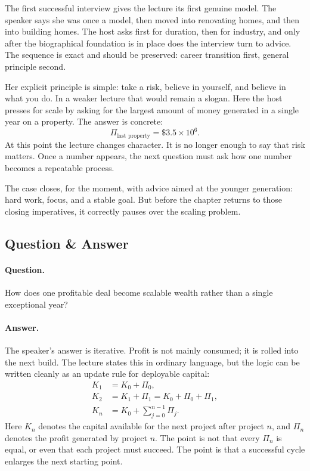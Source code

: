 The first successful interview gives the lecture its first genuine model. The speaker says she was once a model, then moved into renovating homes, and then into building homes. The host asks first for duration, then for industry, and only after the biographical foundation is in place does the interview turn to advice. The sequence is exact and should be preserved: career transition first, general principle second.

Her explicit principle is simple: take a risk, believe in yourself, and believe in what you do. In a weaker lecture that would remain a slogan. Here the host presses for scale by asking for the largest amount of money generated in a single year on a property. The answer is concrete:
\begin{equation}
\Pi_{\text{last property}} = \$3.5\times 10^6.
\end{equation}
At this point the lecture changes character. It is no longer enough to say that risk matters. Once a number appears, the next question must ask how one number becomes a repeatable process.

The case closes, for the moment, with advice aimed at the younger generation: hard work, focus, and a stable goal. But before the chapter returns to those closing imperatives, it correctly pauses over the scaling problem.

\subsection{Question \& Answer}

\paragraph{Question.} How does one profitable deal become scalable wealth rather than a single exceptional year?

\paragraph{Answer.} The speaker's answer is iterative. Profit is not mainly consumed; it is rolled into the next build. The lecture states this in ordinary language, but the logic can be written cleanly as an update rule for deployable capital:
\begin{align}
K_1 &= K_0 + \Pi_0,\\
K_2 &= K_1 + \Pi_1 = K_0 + \Pi_0 + \Pi_1,\\
K_n &= K_0 + \sum_{j=0}^{n-1}\Pi_j.
\end{align}
Here \(K_n\) denotes the capital available for the next project after project \(n\), and \(\Pi_n\) denotes the profit generated by project \(n\). The point is not that every \(\Pi_n\) is equal, or even that each project must succeed. The point is that a successful cycle enlarges the next starting point.

